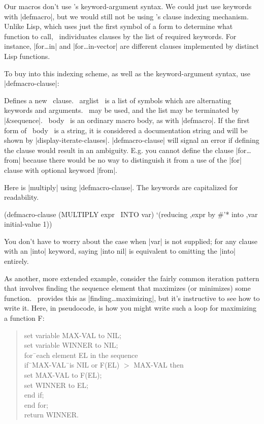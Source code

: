 Our macros don't use \iter's keyword-argument
syntax.  We could just use keywords with |defmacro|, but we would
still not be using \iter's clause indexing mechanism.  Unlike Lisp,
which uses just the first symbol of a form to determine what function
to call, \iter\ individuates clauses by the list of required keywords.
For instance, |for\dots in| and |for\dots in-vector| are different clauses
implemented by distinct Lisp functions.

To buy into this indexing scheme, as well as the keyword-argument
syntax, use |defmacro-clause|:

\begin{clauses}

Defines a new \iter\ clause.  ~arglist~ is a list of symbols which are
alternating keywords and arguments.  \opt\ may be used, and the list
may be terminated by |\&sequence|.  ~body~ is an ordinary macro body,
as with |defmacro|.  If the first form of ~body~ is a string, it is
considered a documentation string and will be shown by
|display-iterate-clauses|. |defmacro-clause| will signal an error if
defining the clause would result in an ambiguity.  E.g. you cannot
define the clause |for\dots from| because there would be no way to
distinguish it from a use of the |for| clause with optional keyword |from|.

\end{clauses}

\medskip

Here is |multiply| using |defmacro-clause|.  The keywords are capitalized
for readability.
\begin{program}
(defmacro-clause (MULTIPLY expr \opt\ INTO var)
  `(reducing ,expr by \#'* into ,var initial-value 1))
\end{program}
You don't have to worry about the case when |var| is not supplied; for
any clause with an |into| keyword, saying |into nil| is equivalent to
omitting the |into| entirely.

As another, more extended example, consider the fairly common
iteration pattern that
involves finding the sequence element that maximizes (or minimizes) some
function.  \iter\ provides this as |finding\dots maximizing|, but it's
instructive to see how to write it.
Here, in pseudocode, is how you might write such a loop for
maximizing a function F:

\begin{quote}
\begin{tabbing}
set variable MAX-VAL to NIL; \\
set variable WINNER to NIL; \\
for\=\ each element EL in the sequence \\
\>  if\=\ MAX-VAL\=\ is NIL or F(EL) $>$ MAX-VAL then \\
\>\>    set MAX-VAL to F(EL); \\
\>\>    set WINNER to EL; \\
\>  end if; \\
end for; \\
return WINNER.
\end{tabbing}
\end{quote}

